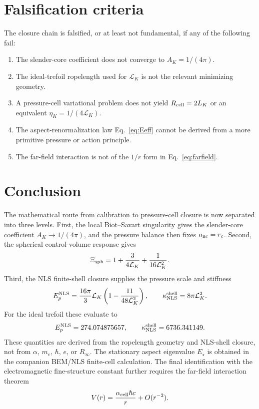 \documentclass[11pt]{article}
\newcommand{\LK}{\mathcal L_K}
\newcommand{\EpNLS}{E_p^{\rm NLS}}
\newcommand{\kappaNLS}{\kappa_{\rm NLS}^{\rm shell}}
\begin{document}
\section{Falsification criteria}

The closure chain is falsified, or at least not fundamental, if any of the following fail:
\begin{enumerate}[label=(F\arabic*)]
\item The slender-core coefficient does not converge to \(A_K=1/(4\pi)\).
\item The ideal-trefoil ropelength used for \(\LK\) is not the relevant minimizing geometry.
\item A pressure-cell variational problem does not yield \(R_{\rm cell}=2L_K\) or an equivalent
      \(\eta_K=1/(4\LK)\).
\item The aspect-renormalization law Eq.~\eqref{eq:Eeff} cannot be derived from a more primitive
      pressure or action principle.
\item The far-field interaction is not of the \(1/r\) form in Eq.~\eqref{eq:farfield}.
\end{enumerate}

\section{Conclusion}

The mathematical route from calibration to pressure-cell closure is now separated into three
levels.  First, the local Biot--Savart singularity gives the slender-core coefficient
\(A_K\to1/(4\pi)\), and the pressure balance then fixes \(a_{\rm nc}=r_c\).  Second, the
spherical control-volume response gives
\[
  \Xi_{\rm sph}
  =
  1+\frac{3}{4\mathcal L_K}+\frac{1}{16\mathcal L_K^2}.
\]
Third, the NLS finite-shell closure supplies the pressure scale and stiffness
\[
  \EpNLS
  =
  \frac{16\pi}{3}\mathcal L_K
  \left(1-\frac{11}{48\mathcal L_K^2}\right),
  \qquad
  \kappaNLS=8\pi\mathcal L_K^2.
\]
For the ideal trefoil these evaluate to
\[
  \EpNLS=274.074875657,
  \qquad
  \kappaNLS=6736.341149.
\]
These quantities are derived from the ropelength geometry and NLS-shell closure, not from
\(\alpha\), \(m_e\), \(\hbar\), \(e\), or \(R_\infty\).  The stationary aspect eigenvalue
\(E_\star\) is obtained in the companion BEM/NLS finite-cell calculation.  The final
identification with the electromagnetic fine-structure constant further requires the
far-field interaction theorem
\[
  V(r)=\frac{\alpha_{\rm cell}\hbar c}{r}+O(r^{-2}).
\]
\end{document}
